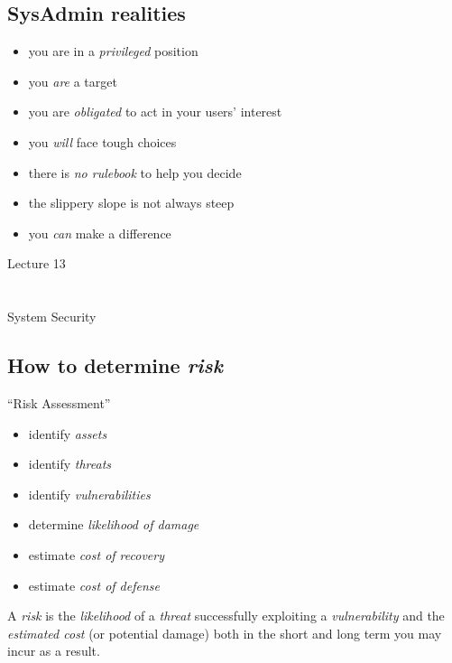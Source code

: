 \documentclass[xga]{xdvislides}
\begin{document}
\subsection{SysAdmin realities}
\begin{itemize}
	\item you are in a {\em privileged} position
	\item you {\em are} a target
	\item you are {\em obligated} to act in your users' interest
	\item you {\em will} face tough choices
	\item there is {\em no rulebook} to help you decide
	\item the slippery slope is not always steep
	\item you {\em can} make a difference
\end{itemize}

\newpage
\vspace*{\fill}
\begin{center}
    \Hugesize
        Lecture 13 \\ [1em]
    \hspace*{5mm}
    \blueline\\
    \hspace*{5mm}\\
	System Security
\end{center}
\vspace*{\fill}

\subsection{How to determine {\em risk}}
``Risk Assessment''
\begin{itemize}
	\item identify {\em assets}
	\item identify {\em threats}
	\item identify {\em vulnerabilities}
	\item determine {\em likelihood of damage}
	\item estimate {\em cost of recovery}
	\item estimate {\em cost of defense}
\end{itemize}
\vspace{.5in}

A {\em risk} is the {\em likelihood} of a {\em threat} successfully exploiting
a {\em vulnerability} and the {\em estimated cost} (or potential damage) both
in the short and long term you may incur as a result.
\end{document}
